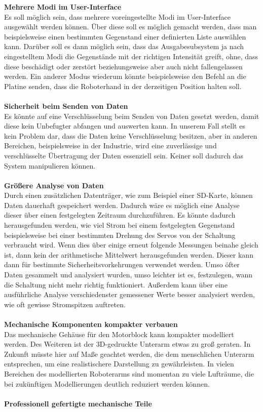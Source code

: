 \documentclass[titlepage,12pt,twoside]{article}
\begin{document}
\textbf{Mehrere Modi im User-Interface} \\
Es soll möglich sein, dass mehrere voreingestellte Modi im User-Interface ausgewählt werden können. 
Über diese soll es möglich gemacht werden, dass man beispielsweise einen bestimmten Gegenstand 
einer definierten Liste auswählen kann. Darüber soll es dann möglich sein, dass das Ausgabesubsystem 
ja nach eingestelltem Modi die Gegenstände mit der richtigen Intensität greift, ohne, dass diese 
beschädigt oder zerstört beziehungsweise aber auch nicht fallengelassen werden. Ein anderer Modus 
wiederum könnte beispielsweise den Befehl an die Platine senden, dass die Roboterhand in der 
derzeitigen Position halten soll. \\
\\
\textbf{Sicherheit beim Senden von Daten} \\
Es könnte auf eine Verschlüsselung beim Senden von Daten gesetzt werden, damit diese kein 
Unbefugter abfangen und auswerten kann. In unserem Fall stellt es kein Problem dar, dass die 
Daten keine Verschlüsselung besitzen, aber in anderen Bereichen, beispielsweise in der Industrie, 
wird eine zuverlässige und verschlüsselte Übertragung der Daten essenziell sein. Keiner soll 
dadurch das System manipulieren können. \\
\\
\textbf{Größere Analyse von Daten} \\
Durch einen zusätzlichen Datenträger, wie zum Beispiel einer SD-Karte, können Daten dauerhaft 
gespeichert werden. Dadurch wäre es möglich eine Analyse dieser über einen festgelegten Zeitraum 
durchzuführen. Es könnte dadurch herausgefunden werden, wie viel Strom bei einem festgelegten 
Gegenstand beispielsweise bei einer bestimmten Drehung des Servos von der Schaltung verbraucht 
wird. Wenn dies über einige erneut folgende Messungen beinahe gleich ist, dann kein der 
arithmetische Mittelwert herausgefunden werden. Dieser kann dann für bestimmte 
Sicherheitsvorkehrungen verwendet werden. Umso öfter Daten gesammelt und analysiert wurden, umso 
leichter ist es, festzulegen, wann die Schaltung nicht mehr richtig funktioniert. Außerdem kann 
über eine ausführliche Analyse verschiedenster gemessener Werte besser analysiert werden, wie oft 
gewisse Stromspitzen auftreten. \\
\\
\textbf{Mechanische Komponenten kompakter verbauen} \\
Das mechanische Gehäuse für den Motorblock kann kompakter modelliert werden. Des Weiteren ist der 
3D-gedruckte Unterarm etwas zu groß geraten. In Zukunft müsste hier auf Maße geachtet werden, die 
dem menschlichen Unterarm entsprechen, um eine realistischere Darstellung zu gewährleisten. 
In vielen Bereichen des modellierten Roboterarms sind momentan zu viele Lufträume, die bei 
zukünftigen Modellierungen deutlich reduziert werden können. \\
\\
\textbf{Professionell gefertigte mechanische Teile} \\
\end{document}
